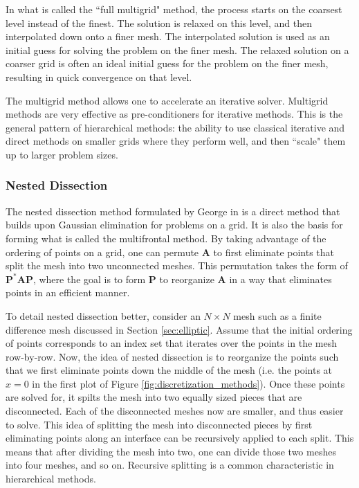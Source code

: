 In what is called the ``full multigrid" method, the process starts on the coarsest level instead of the finest. The solution is relaxed on this level, and then interpolated down onto a finer mesh. The interpolated solution is used as an initial guess for solving the problem on the finer mesh. The relaxed solution on a coarser grid is often an ideal initial guess for the problem on the finer mesh, resulting in quick convergence on that level.

The multigrid method allows one to accelerate an iterative solver. Multigrid methods are very effective as pre-conditioners for iterative methods. This is the general pattern of hierarchical methods: the ability to use classical iterative and direct methods on smaller grids where they perform well, and then ``scale" them up to larger problem sizes.

\subsubsection{Nested Dissection}
\label{subsub:nested-dissection}

The nested dissection method formulated by George in \citep{george1973nested} is a direct method that builds upon Gaussian elimination for problems on a grid. It is also the basis for forming what is called the multifrontal method. By taking advantage of the ordering of points on a grid, one can permute $\textbf{A}$ to first eliminate points that split the mesh into two unconnected meshes. This permutation takes the form of $\textbf{P}^* \textbf{A} \textbf{P}$, where the goal is to form $\textbf{P}$ to reorganize $\textbf{A}$ in a way that eliminates points in an efficient manner.

To detail nested dissection better, consider an $N \times N$ mesh such as a finite difference mesh discussed in Section \ref{sec:elliptic}. Assume that the initial ordering of points corresponds to an index set that iterates over the points in the mesh row-by-row. Now, the idea of nested dissection is to reorganize the points such that we first eliminate points down the middle of the mesh (i.e. the points at $x = 0$ in the first plot of Figure \ref{fig:discretization_methods}). Once these points are solved for, it spilts the mesh into two equally sized pieces that are disconnected. Each of the disconnected meshes now are smaller, and thus easier to solve. This idea of splitting the mesh into disconnected pieces by first eliminating points along an interface can be recursively applied to each split. This means that after dividing the mesh into two, one can divide those two meshes into four meshes, and so on. Recursive splitting is a common characteristic in hierarchical methods.


